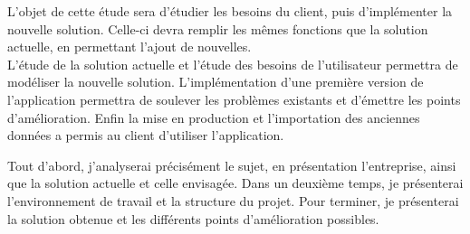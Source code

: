 L'objet de cette étude sera d'étudier les besoins du client, puis d'implémenter la nouvelle solution. Celle-ci devra remplir les mêmes fonctions que la solution actuelle, en permettant l'ajout de nouvelles.
\\



L'étude de la solution actuelle et l'étude des besoins de l'utilisateur permettra de modéliser la nouvelle solution. L'implémentation d'une première version de l'application permettra de soulever les problèmes existants et d'émettre les points d'amélioration. Enfin la mise en production et l'importation des anciennes données a permis au client d'utiliser l'application.


Tout d'abord, j'analyserai précisément le sujet, en présentation l'entreprise, ainsi que la solution actuelle et celle envisagée. Dans un deuxième temps, je présenterai l'environnement de travail et la structure du projet. Pour terminer, je présenterai la solution obtenue et les différents points d'amélioration possibles.